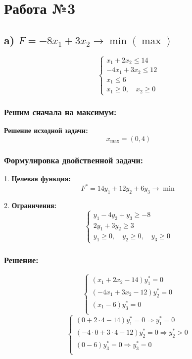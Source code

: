 \documentclass[17pt]{extarticle}
\begin{document}
\section*{Работа №3}
\subsection*{a) \( F = -8x_1 + 3x_2 \to \min (\max) \)}

\[
    \begin{cases}
        x_1 + 2x_2 \leq 14   \\
        -4x_1 + 3x_2 \leq 12 \\
        x_1 \leq 6           \\
        x_1 \geq 0, \quad x_2 \geq 0
    \end{cases}
\]

\subsubsection*{Решим сначала на максимум:}

\textbf{Решение исходной задачи:}
\[
    x_{\text{max}} = (0, 4)
\]

\subsubsection*{Формулировка двойственной задачи:}

1. \textbf{Целевая функция:}
\[
    F^* = 14y_1 + 12y_2 + 6y_3 \to \min
\]

2. \textbf{Ограничения:}
\[
    \begin{cases}
        y_1 - 4y_2 + y_3 \geq -8 \\
        2y_1 + 3y_2 \geq 3       \\
        y_1 \geq 0, \quad y_2 \geq 0, \quad y_3 \geq 0
    \end{cases}
\]
\subsubsection*{Решение:}
\[
    \begin{cases}
        (x_1 + 2x_2 - 14) y_1^* = 0   \\
        (-4x_1 + 3x_2 - 12) y_2^* = 0 \\
        (x_1 - 6) y_3^* = 0           \\
    \end{cases}
\]
\[
    \begin{cases}
        (0 + 2 \cdot 4 - 14) y_1^* = 0 \Rightarrow y_1^* = 0          \\
        (-4 \cdot 0 + 3 \cdot 4 - 12) y_2^* = 0 \Rightarrow y_2^* > 0 \\
        (0 - 6) y_3^* = 0 \Rightarrow y_3^* = 0                       \\
    \end{cases}
\]
\end{document}
